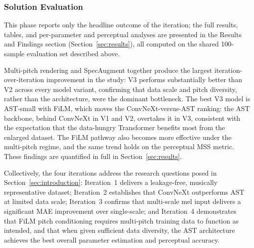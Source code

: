 \subsubsection{Solution Evaluation}

\noindent
This phase reports only the headline outcome of the iteration; the full results, tables, and per-parameter and perceptual analyses are presented in the Results and Findings section (Section~\ref{sec:results}), all computed on the shared 100-sample evaluation set described above.

\noindent \newline
Multi-pitch rendering and SpecAugment together produce the largest iteration-over-iteration improvement in the study: V3 performs substantially better than V2 across every model variant, confirming that data scale and pitch diversity, rather than the architecture, were the dominant bottleneck. The best V3 model is AST-small with FiLM, which moves the ConvNeXt-versus-AST ranking: the AST backbone, behind ConvNeXt in V1 and V2, overtakes it in V3, consistent with the expectation that the data-hungry Transformer benefits most from the enlarged dataset. The FiLM pathway also becomes more effective under the multi-pitch regime, and the same trend holds on the perceptual MSS metric. These findings are quantified in full in Section~\ref{sec:results}.

\noindent \newline
Collectively, the four iterations address the research questions posed in Section~\ref{sec:introduction}: Iteration~1 delivers a leakage-free, musically representative dataset; Iteration~2 establishes that ConvNeXt outperforms AST at limited data scale; Iteration~3 confirms that multi-scale mel input delivers a significant MAE improvement over single-scale; and Iteration~4 demonstrates that FiLM pitch conditioning requires multi-pitch training data to function as intended, and that when given sufficient data diversity, the AST architecture achieves the best overall parameter estimation and perceptual accuracy.
